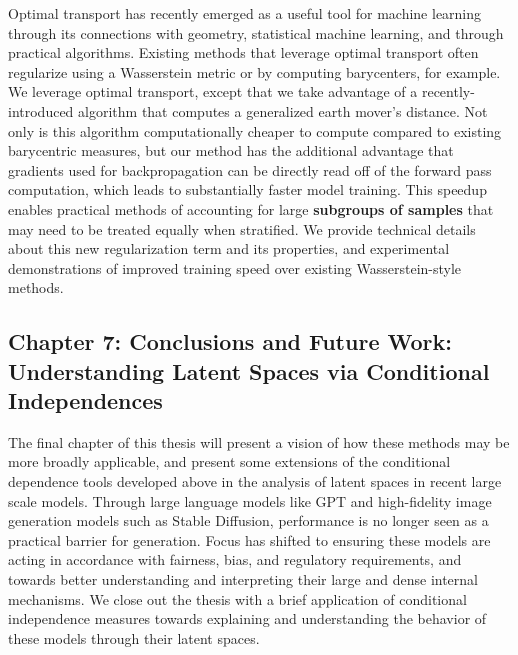 Optimal transport has recently emerged as a useful tool 
for machine learning through its connections with geometry,
statistical machine learning, and through practical algorithms.
Existing methods that leverage optimal transport often  regularize using 
a Wasserstein metric or by computing barycenters, for example. %
We leverage optimal transport,
except that we take advantage of a recently-introduced algorithm
that computes a generalized earth mover's distance.
Not only is this algorithm computationally cheaper
to compute compared to existing barycentric measures,
but our method has the additional advantage that gradients used for backpropagation 
can be directly read off of the forward pass computation, which leads to substantially faster model training.
This speedup enables practical methods of accounting for large \textbf{subgroups of samples} that
may need to be treated equally when stratified.
We provide technical details about this new regularization term and its properties, 
and 
experimental demonstrations of improved training speed over existing Wasserstein-style methods.

\subsection{Chapter 7: Conclusions and Future Work: Understanding Latent Spaces via Conditional Independences}
The final chapter of this thesis will
present a 
vision of how these methods may be more broadly applicable,
and present
some extensions of the 
conditional dependence tools
developed above in the analysis of latent spaces in recent large scale models.
Through large language models like GPT
and high-fidelity
image generation models such as Stable Diffusion,
performance is no longer 
seen as a practical barrier for generation.
Focus has shifted to ensuring these models
are acting in accordance with
fairness, bias, and regulatory requirements,
and towards better understanding and interpreting
their large and dense internal mechanisms.
We close out the thesis with a brief application 
of conditional independence measures towards
explaining and understanding the behavior 
of these models through their latent spaces.


